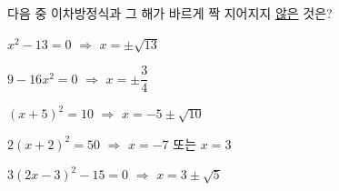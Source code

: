 다음 중 이차방정식과 그 해가 바르게 짝 지어지지 \underline{않은} \mbox{것은?}
\begin{choicesv}{\rule[-3ex]{0pt}{8ex}$x^2-13=0$ $\Rightarrow$ $x=\pm\sqrt{13}$}{\rule[-3ex]{0pt}{8ex}$9-16x^2=0$ $\Rightarrow$ $x=\pm\dfrac{3}{4}$}{\rule[-3ex]{0pt}{8ex}$(x+5)^2=10$ $\Rightarrow$ $x=-5\pm\sqrt{10}$}{\rule[-3ex]{0pt}{8ex}$2(x+2)^2=50$ $\Rightarrow$ $x=-7$ 또는 $x=3$}{\rule[-3ex]{0pt}{8ex}$3(2x-3)^2-15=0$ $\Rightarrow$ $x=3\pm\sqrt{5}$}\end{choicesv}
